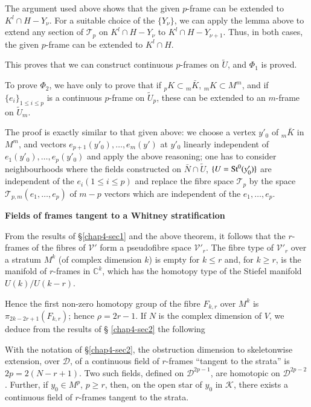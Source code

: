The argument used above shows that the given $p$-frame can be extended
to $K^{l}\cap H-Y_{\nu}$. For a suitable choice of the $\{Y_{\nu}\}$,
we can apply the lemma above to extend any section of
$\mathscr{T}_{p}$ on $K^{l}\cap H-Y_{\nu}$ to $K^{l}\cap
H-Y_{\nu+1}$. Thus, in both cases, the given $p$-frame can be extended
to $K^{l}\cap H$.

This proves that we can construct continuous $p$-frames on
$\widetilde{U}$, and $\Phi_{1}$ is proved.

To prove $\Phi_{2}$, we have only to prove that if ${}_{p}K\subset
{}_{m}\bar{K}$, ${}_{m}K\subset M^{m}$, and if $\{e_{i}\}_{1\leq i\leq
  p}$ is a continuous $p$-frame on $\widetilde{U}_{p}$, these can be
extended to an $m$-frame on $\widetilde{U}_{m}$. 

The proof is exactly similar to that given above: we choose a vertex
$y'_{0}$ of ${}_{m}\bar{K}$ in $M^{m}$, and vectors
$e_{p+1}(y'_{0}),\ldots,e_{m}(y')$ at $y'_{0}$ linearly independent of
$e_{1}(y'_{0}),\ldots,e_{p}(y'_{0})$ and apply the above reasoning;
one has to consider neighbourhoods where the fields constructed on
$\bar{N}\cap \widetilde{U}$, $\{U=\operatorname{St}^{0}(y'_{0})\}$ are independent
of the $e_{i}(1\leq i\leq p)$ and replace the fibre space
$\mathscr{T}_{p}$ by the space $\mathscr{T}_{p,m}(e_{1},\ldots,e_{p})$
of $m-p$ vectors which are independent of the $e_{1},\ldots,e_{p}$. 


\medskip
\noindent
{\large\bf Fields of frames tangent to a Whitney
  stratification}\pageoriginale
\smallskip

From the results of \S \ref{chap4-sec1} and the above theorem, it
follows that the $r$-frames of the fibres of $\mathscr{V}'$ form a
pseudofibre space $\mathscr{V}'_{r}$. The fibre type of
$\mathscr{V}'_{r}$ over a stratum $M^{k}$ (of complex dimension $k$)
is empty for $k\leq r$ and, for $k\geq r$, is the manifold of
$r$-frames in $\mathbb{C}^{k}$, which has the homotopy type of the
Stiefel manifold $U(k)/U(k-r)$.

Hence the first non-zero homotopy group of the fibre $F_{k,r}$ over
$M^{k}$ is $\pi_{2k-2r+1}(F_{k,r})$; hence $\rho=2r-1$. If $N$ is the
complex dimension of $V$, we deduce from the results of \S
\ref{chap4-sec2} the following

\begin{prop*} %
With the notation of \S \ref{chap4-sec2}, the obstruction dimension to
skeletonwise extension, over $\mathscr{D}$, of a continuous field of
$r$-frames ``tangent to the strata'' is $2p=2(N-r+1)$. Two such
fields, defined on $\mathscr{D}^{2p-1}$, are homotopic on
$\mathscr{D}^{2p-2}$. Further, if $y_{0}\in M^{p}$, $p\geq r$, then,
on the open star of $y_{0}$ in $\mathscr{K}$, there exists a
continuous field of $r$-frames tangent to the strata.
\end{prop*}

